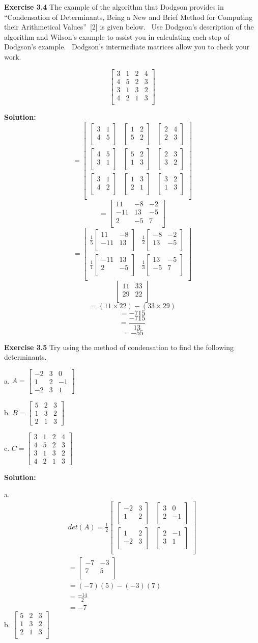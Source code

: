\documentclass[12pt]{article}
\newcommand{\sol} {\textbf{Solution:}}
\newcommand{\matxx}[2] {
\begin{bmatrix}
  #1 \\
  #2 \\
\end{bmatrix}
}
\newcommand{\matxxx}[3] {
\begin{bmatrix}
  #1 \\
  #2 \\
  #3 \\
\end{bmatrix}
}
\newcommand{\matxxxx}[4] {
\begin{bmatrix}
  #1 \\
  #2 \\
  #3 \\
  #4 \\
\end{bmatrix}
}
\begin{document}
\pagebreak

\noindent\textbf{Exercise 3.4} The example of the algorithm that Dodgson
provides in \textquotedblleft Condensation of Determinants, Being a New and
Brief Method for Computing their Arithmetical Values\textquotedblright\ [2] is
given below. \ Use Dodgson's description of the algorithm and Wilson's example
to assist you in calculating each step of Dodgson's example. \ Dodgson's
intermediate matrices allow you to check your work.%

\[
\matxxxx{3&1&2&4}
		{4&5&2&3}
        {3&1&3&2}
        {4&2&1&3}
\]

\bigskip
\sol
\[
=
\matxxx
	{\matxx{3&1}{4&5} & \matxx{1&2}{5&2} & \matxx{2&4}{2&3}}
    {\matxx{4&5}{3&1} & \matxx{5&2}{1&3} & \matxx{2&3}{3&2}}
    {\matxx{3&1}{4&2} & \matxx{1&3}{2&1} & \matxx{3&2}{1&3}}
\]
\[
=
\matxxx
	{11 & -8 & -2}
    {-11 & 13 & -5}
    {2 & -5 & 7}
\]
\[
=
\matxx
	{\frac{1}{5}\matxx{11&-8}{-11&13} & \frac{1}{2}\matxx{-8&-2}{13&-5}}
    {\frac{1}{1}\matxx{-11&13}{2&-5} & \frac{1}{3}\matxx{13&-5}{-5&7}} \]
\[
\matxx{11 & 33}{29 & 22}
\]
\[
=(11 \times 22) - (33 \times 29)
\]
\[
= - 715
\]
\[=\frac{-715}{13}\]
\[=-55\]

\pagebreak

\noindent\textbf{Exercise 3.5} Try using the method of condensation to find
the following determinants.

\bigskip
a. $%
A = \begin{bmatrix}
-2 & 3 & 0\\
1 & 2 & -1\\
-2 & 3 & 1
\end{bmatrix}
$

b. $%
B = \begin{bmatrix}
5 & 2 & 3\\
1 & 3 & 2\\
2 & 1 & 3
\end{bmatrix}
$

c. $%
C = \begin{bmatrix}
3 & 1 & 2 & 4\\
4 & 5 & 2 & 3\\
3 & 1 & 3 & 2\\
4 & 2 & 1 & 3
\end{bmatrix}
$

\bigskip
\sol

\bigskip
a.
\[
\begin{split}
det(A) =
\frac{1}{2}
\matxx
  {
    \matxx{-2 & 3}{1 & 2} &
    \matxx{3 & 0}{2 & -1}
  }
  {
    \matxx{1 & 2}{-2 & 3} &
    \matxx{2 & -1}{3 & 1}
  } \\
  = \matxx{-7 & -3}{7 & 5} \\
  = (-7)(5) - (-3)(7) \\
  = \frac{-14}{2} \\
  = -7
\end{split}
\]
b.
\(
\matxxx{5&2&3}
		{1&3&2}
		{2&1&3}
\)
\end{document}

